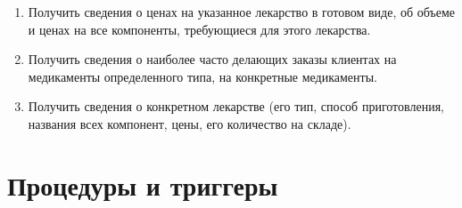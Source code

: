 \documentclass[a4paper]{article}
\begin{document}
\begin{enumerate}
				
				
				
			\item Получить сведения о ценах на указанное лекарство в готовом виде, об объеме и ценах на все компоненты, требующиеся для этого лекарства.
				
			\item Получить сведения о наиболее часто делающих заказы клиентах на медикаменты определенного типа, на конкретные медикаменты.
				
				
				
			\item Получить сведения о конкретном лекарстве (его тип, способ приготовления, названия всех компонент, цены, его количество на складе).
				
		\end{enumerate}
		
	\newpage
	
	\section{Процедуры и триггеры}
\end{document}
